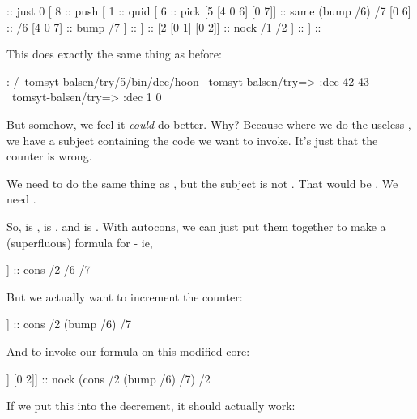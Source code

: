 \begin{code}
[ 8                                          ::  push
  [1 0]                                      ::  just 0
  [ 8                                        ::  push
    [ 1                                      ::  quid
      [ 6                                    ::  pick
        [5 [4 0 6] [0 7]]                    ::  same (bump /6) /7
        [0 6]                                ::  /6
        [4 0 7]                              ::  bump /7
      ]                                      :: 
    ]                                        :: 
    [2 [0 1] [0 2]]                          ::  nock /1 /2
  ]                                          :: 
]                                            :: 
\end{code}
This does exactly the same thing as before:

\begin{code}
: /~tomsyt-balsen/try/5/bin/dec/hoon
~tomsyt-balsen/try=> :dec 42
43
~tomsyt-balsen/try=> :dec 1
0
\end{code}
But somehow, we feel it \emph{could} do better.  Why?  Because where
we do the useless \kode{[4 0 7]}, we have a subject containing the
code we want to invoke.  It's just that the counter is wrong.

We need to do the same thing as \kode{[2 [0 1] [0 2]}, but the subject
is not \kode{[0 1]}.  That would be .  We
need .

So,  is \kode{[0 2]},  is \kode{[0 6]}, and  is
\kode{[0 7]}.  With autocons, we can just put them together to make a
(superfluous) formula for  - ie,

\begin{code}
[[0 2] [0 6] [0 7]]               ::  cons /2 /6 /7
\end{code}
But we actually want to increment the counter:

\begin{code}
[[0 2] [4 0 6] [0 7]]             ::  cons /2 (bump /6) /7
\end{code}
And to invoke our formula on this modified core:

\begin{code}
[2 [[0 2] [4 0 6] [0 7]] [0 2]]   ::  nock (cons /2 (bump /6) /7) /2
\end{code}
If we put this into the decrement, it should actually work:

